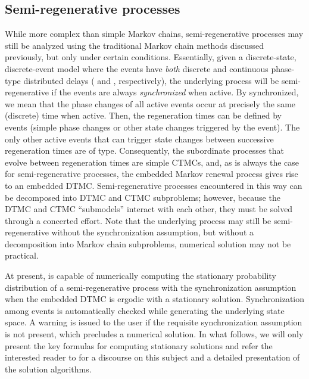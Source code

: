 \begin{private}
\section{Semi-regenerative processes}\label{SEC:semi-regen-processes}
While more complex than simple Markov chains,
semi-regenerative processes may still be analyzed using
the traditional Markov chain methods discussed previously, but only under certain conditions.
Essentially, given a discrete-state, discrete-event model where the events have \emph{both}
discrete and continuous phase-type distributed delays
( and , respectively),
the underlying process will be semi-regenerative
if the  events are always \emph{synchronized} when active.
By synchronized,
we mean that the phase changes of all active  events occur at precisely the
same (discrete) time when active.
Then, the regeneration times can be defined by  events
(simple phase changes or other state changes triggered by the event).
The only other active events that can trigger state changes between successive regeneration times
are of  type.  Consequently, the subordinate processes that evolve between
regeneration times are simple CTMCs, and, as is always the case for semi-regenerative processes,
the embedded Markov renewal process gives rise to an embedded DTMC.
Semi-regenerative processes encountered in this way can be decomposed into
DTMC and CTMC subproblems; however, because the DTMC and CTMC ``submodels'' interact
with each other, they must be solved through a concerted effort.
Note that the underlying process may still be semi-regenerative without the synchronization
assumption, but without a decomposition into Markov chain subproblems, numerical solution
may not be practical.

At present, {\smart} is capable of numerically computing the stationary probability distribution
of a semi-regenerative process with the synchronization assumption when
the embedded DTMC is ergodic with a stationary solution.
Synchronization among  events is automatically checked while generating the
underlying state space.  A warning is issued to the user if the requisite synchronization
assumption is not present, which precludes a numerical solution.
In what follows, we will only present the key formulas for computing stationary solutions
and refer the interested reader to \cite{Jones-NASA-00}
for a discourse on this subject and a detailed presentation of the solution algorithms.


\end{private}

